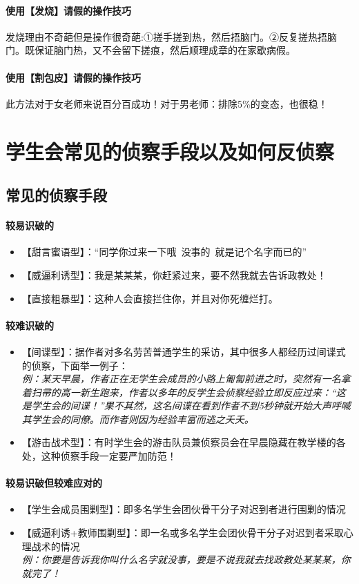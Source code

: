 \documentclass[UTF8]{ctexart}
\begin{document}
\paragraph{使用【发烧】请假的操作技巧}
发烧理由不奇葩但是操作很奇葩:①搓手搓到热，然后捂脑门。②反复搓热捂脑门。既保证脑门热，又不会留下搓痕，然后顺理成章的在家歇病假。
\paragraph{使用【割包皮】请假的操作技巧}
此方法对于女老师来说百分百成功！对于男老师：排除5\%的变态，也很稳！


\section{学生会常见的侦察手段以及如何反侦察}
	\subsection{常见的侦察手段}
	\paragraph{较易识破的}
	\begin{itemize}
		\item 【甜言蜜语型】：“同学你过来一下哦~没事的~就是记个名字而已的”
		\item 【威逼利诱型】：我是某某某，你赶紧过来，要不然我就去告诉政教处！
		\item 【直接粗暴型】：这种人会直接拦住你，并且对你死缠烂打。
	\end{itemize}
	\paragraph{较难识破的}
\begin{itemize}
	\item 【间谍型】：据作者对多名劳苦普通学生的采访，其中很多人都经历过间谍式的侦察，下面举一例子：\\
			\textit{例：某天早晨，作者正在无学生会成员的小路上匍匐前进之时，突然有一名拿着扫帚的高一新生跑来，作者以多年的反学生会侦察经验立即反应过来：“这是学生会的间谍！”果不其然，这名间谍在看到作者不到5秒钟就开始大声呼喊其学生会的同僚。而作者则因为经验丰富而逃之夭夭。}
	\item 【游击战术型】：有时学生会的游击队员兼侦察员会在早晨隐藏在教学楼的各处，这种侦察手段一定要严加防范！
\end{itemize}
	\paragraph{较易识破但较难应对的}
		\begin{itemize}
		\item 【学生会成员围剿型】：即多名学生会团伙骨干分子对迟到者进行围剿的情况
		\item 【威逼利诱+教师围剿型】：即一名或多名学生会团伙骨干分子对迟到者采取心理战术的情况\\
		\textit{例：你要是告诉我你叫什么名字就没事，要是不说我就去找政教处某某某，你就完了！}
		\end{itemize}
\end{document}
